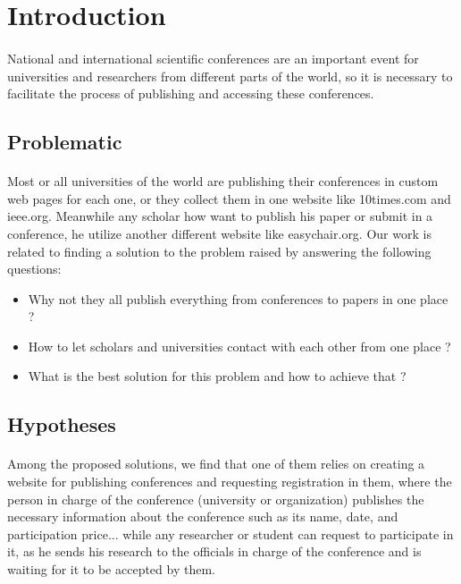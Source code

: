 \section{Introduction}
	\paragraph{}
	National and international scientific conferences are an important event for universities and researchers from different parts of the world, so it is necessary to facilitate the process of publishing and accessing these conferences.
	\subsection{Problematic}
		\paragraph{}
		Most or all universities of the world are publishing their conferences in custom web pages for each one, or they collect them in one website like 10times.com and ieee.org. Meanwhile any scholar how want to publish his paper or submit in a conference, he utilize another different website like easychair.org. Our work is related to finding a solution to the problem raised by answering the following questions:
			\begin{itemize}
				\item Why not they all publish everything from conferences to papers in one place ?
				\item How to let scholars and universities contact with each other from one place ?
				\item What is the best solution for this problem and how to achieve that ?
			\end{itemize}
	\subsection{Hypotheses}
		\paragraph{}
		Among the proposed solutions, we find that one of them relies on creating a website for publishing conferences and requesting registration in them, where the person in charge of the conference (university or organization) publishes the necessary information about the conference such as its name, date, and participation price... while any researcher or student can request to participate in it, as he sends his research to the officials in charge of the conference and is waiting for it to be accepted by them.
